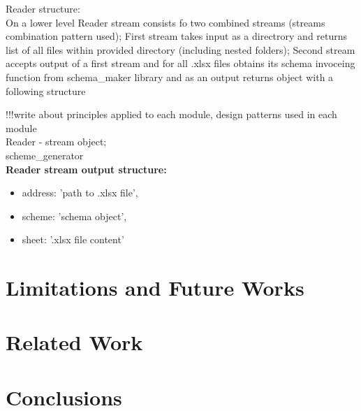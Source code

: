 \documentclass{llncs}
\begin{document}
Reader structure:\\
On a lower level Reader stream consists fo two combined streams (streams combination pattern used);
First stream takes input as a directrory and returns list of all files within provided directory (including nested folders);
Second stream accepts output of a first stream and for all .xlsx files obtains its schema invoceing function from schema\_maker library and as an output returns object with a following structure

!!!write about principles applied to each module, design patterns used in each module\\

Reader - stream object;\\
scheme\_generator\\

\textbf{Reader stream output structure:}
\begin{itemize}
\item address: 'path to .xlsx file',
\item scheme: 'schema object',
\item sheet: '.xlsx file content'
\end{itemize}




\section{Limitations and Future Works}
\label{sec:limitations_and_future_work}

\section{Related Work}
\label{sec:related_work}

\section{Conclusions}
\label{sec:conclusion}



\end{document}
